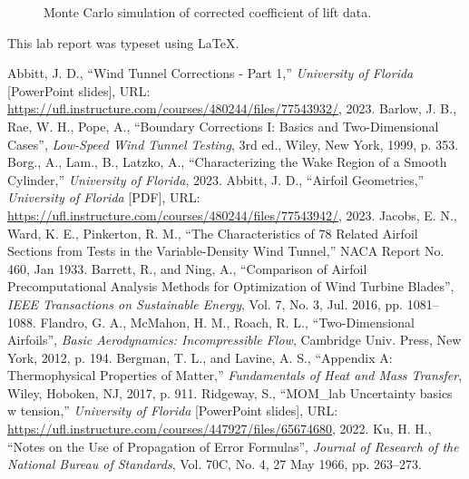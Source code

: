 \documentclass[journal,letterpaper]{IEEEtran}
\begin{document}
\begin{figure}[H]
    \centering
    
    \caption{Monte Carlo simulation of corrected coefficient of lift data.}
    \label{fig:Correct}
\end{figure}

\noindent
This lab report was typeset using \LaTeX.

\begin{thebibliography}{99}
     Abbitt, J. D., ``Wind Tunnel Corrections - Part 1,'' \textit{University of Florida} [PowerPoint slides], URL: \url{https://ufl.instructure.com/courses/480244/files/77543932/}, 2023.
     Barlow, J. B., Rae, W. H., Pope, A., ``Boundary Corrections I: Basics and Two-Dimensional Cases'', \textit{Low-Speed Wind Tunnel Testing}, 3rd ed., Wiley, New York, 1999, p. 353.
     Borg., A., Lam., B., Latzko, A., ``Characterizing the Wake Region of a Smooth Cylinder,'' \textit{University of Florida}, 2023.
     Abbitt, J. D., ``Airfoil Geometries,'' \textit{University of Florida} [PDF], URL: \url{https://ufl.instructure.com/courses/480244/files/77543942/}, 2023.
     Jacobs, E. N., Ward, K. E., Pinkerton, R. M., ``The Characteristics of 78 Related Airfoil Sections from Tests in the Variable-Density Wind Tunnel,'' NACA Report No. 460, Jan 1933.
     Barrett, R., and Ning, A., ``Comparison of Airfoil Precomputational Analysis Methods for Optimization of Wind Turbine Blades'', \textit{IEEE Transactions on Sustainable Energy}, Vol. 7, No. 3, Jul. 2016, pp. 1081--1088.
     Flandro, G. A., McMahon, H. M., Roach, R. L., ``Two-Dimensional Airfoils'', \textit{Basic Aerodynamics: Incompressible Flow}, Cambridge Univ. Press, New York, 2012, p. 194.
     Bergman, T. L., and Lavine, A. S., ``Appendix A: Thermophysical Properties of Matter,'' \textit{Fundamentals of Heat and Mass Transfer}, Wiley, Hoboken, NJ, 2017, p. 911.
     Ridgeway, S., ``MOM\_lab Uncertainty basics w tension,'' \textit{University of Florida} [PowerPoint slides], URL: \url{https://ufl.instructure.com/courses/447927/files/65674680}, 2022.
     Ku, H. H., ``Notes on the Use of Propagation of Error Formulas'', \textit{Journal of Research of the National Bureau of Standards}, Vol. 70C, No. 4, 27 May 1966, pp. 263--273.
\end{thebibliography}
\end{document}
